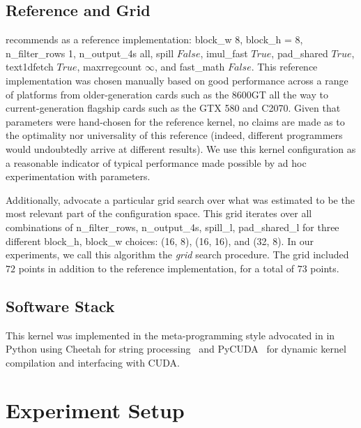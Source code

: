 \documentclass{sig-alternate}
\begin{document}
\subsection{Reference and Grid}
\label{sec:refgrid}

\cite{pinto+cox:2011gcg} recommends as a reference implementation: block\_w 8, 
block\_h = 8, n\_filter\_rows 1, n\_output\_4s all, spill $False$, imul\_fast $True$,
pad\_shared $True$, 
text1dfetch $True$,
maxrregcount $\infty$,
and fast\_math $False$.
This reference implementation was chosen manually based on good performance across a range of platforms from older-generation
cards such as the
8600GT all the way to
current-generation flagship cards such as the GTX 580 and C2070.
Given that parameters were hand-chosen for the reference kernel, no claims are
made as to the optimality nor universality of this reference (indeed, different
programmers would undoubtedly arrive at different results).  We use this
kernel configuration as a reasonable indicator of typical performance
made possible by ad hoc experimentation with parameters.

Additionally, \cite{pinto+cox:2011gcg} advocate a particular grid search over
what was estimated to be the most relevant part of the configuration space.
This grid iterates over all
combinations of n\_filter\_rows, n\_output\_4s, spill\_l, pad\_shared\_l for three different block\_h, block\_w choices: (16, 8), (16, 16), and (32, 8).
In our experiments, we call this algorithm the {\em grid} search procedure.
The grid included $72$ points in addition to the reference implementation, for a total of $73$ points.

\subsection{Software Stack}

This kernel was implemented in the meta-programming style advocated
in \citet{pinto+cox:2011gcg} in Python using
Cheetah for string processing~\citep{cheetah}
and PyCUDA~\citep{klochner+etal:2009} for dynamic kernel
compilation and interfacing with CUDA.


\section{Experiment Setup}
\end{document}
